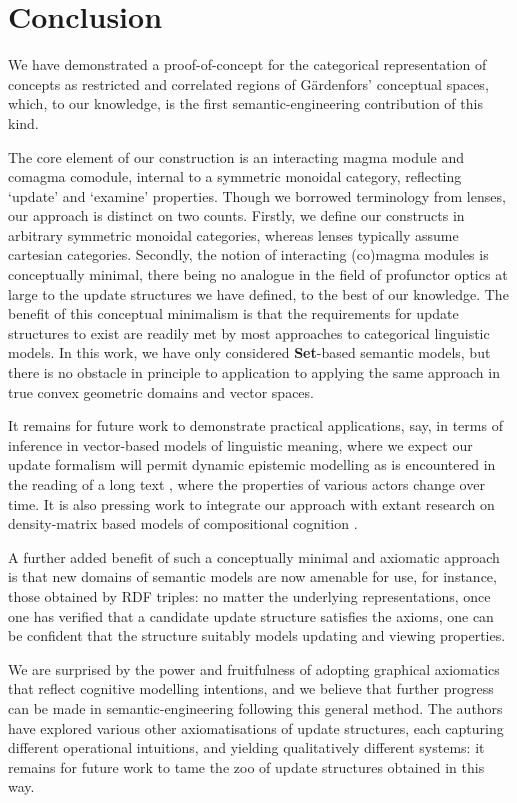 \documentclass[11pt]{article}
\theoremstyle{definition}
\theoremstyle{plain}
\begin{document}
\section{Conclusion}

We have demonstrated a proof-of-concept for the categorical representation of concepts as restricted and correlated regions of G\"{a}rdenfors' conceptual spaces, which, to our knowledge, is the first semantic-engineering contribution of this kind.

The core element of our construction is an interacting magma module and comagma comodule, internal to a symmetric monoidal category, reflecting `update' and `examine' properties. Though we borrowed terminology from lenses, our approach is distinct on two counts. Firstly, we define our constructs in arbitrary symmetric monoidal categories, whereas lenses typically assume cartesian categories. Secondly, the notion of interacting (co)magma modules is conceptually minimal, there being no analogue in the field of profunctor optics at large to the update structures we have defined, to the best of our knowledge. The benefit of this conceptual minimalism is that the requirements for update structures to exist are readily met by most approaches to categorical linguistic models. In this work, we have only considered \textbf{Set}-based semantic models, but there is no obstacle in principle to application to applying the same approach in true convex geometric domains and vector spaces.

It remains for future work to demonstrate practical applications, say, in terms of inference in vector-based models of linguistic meaning, where we expect our update formalism will permit dynamic epistemic modelling as is encountered in the reading of a long text \cite{coecke_mathematics_2019}, where the properties of various actors change over time. It is also pressing work to integrate our approach with extant research on density-matrix based models of compositional cognition \cite{al-mehairi_compositional_2016}.

A further added benefit of such a conceptually minimal and axiomatic approach is that new domains of semantic models are now amenable for use, for instance, those obtained by RDF triples: no matter the underlying representations, once one has verified that a candidate update structure satisfies the axioms, one can be confident that the structure suitably models updating and viewing properties.

We are surprised by the power and fruitfulness of adopting graphical axiomatics that reflect cognitive modelling intentions, and we believe that further progress can be made in semantic-engineering following this general method. The authors have explored various other axiomatisations of update structures, each capturing different operational intuitions, and yielding qualitatively different systems: it remains for future work to tame the zoo of update structures obtained in this way.
\end{document}
